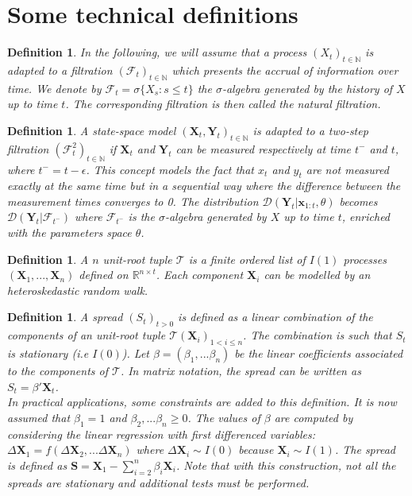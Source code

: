 \documentclass[11pt,a4,twosided,singlespacing,titlepagenumber=on]{scrreprt}
\numberwithin{equation}{chapter} %
\newtheorem{definition}[theorem]{Definition}%
\theoremstyle{remark}
\newcommand{\matr}[1]{\mathbf{#1}}
\begin{document}
\section{Some technical definitions}

\begin{definition}
In the following, we will assume that a process $(X_t)_{t \in \mathbb{N}}$ is adapted to a filtration $(\mathcal{F}_t)_{t \in \mathbb{N}}$ which presents the accrual of information over time. We denote by $\mathcal{F}_t = \sigma \{X_s : s \leq t \}$ the $\sigma$-algebra generated by the history of $X$ up to time $t$. The corresponding filtration is then called the natural filtration.
\end{definition}

\begin{definition}
A state-space model $(\matr{X}_t, \matr{Y}_t)_{t \in \mathbb{N}}$ is adapted to a two-step filtration $(\mathcal{F}^2_t)_{t \in \mathbb{N}}$ if $\matr{X}_t$ and $\matr{Y}_t$ can be measured respectively at time $t^-$ and $t$, where $t^- = t - \epsilon$. This concept models the fact that $x_t$ and $y_t$ are not measured exactly at the same time but in a sequential way where the difference between the measurement times converges to 0. The distribution $\mathcal{D}(\matr{Y}_t | \matr{x}_{1:t}, \theta)$ becomes $\mathcal{D}(\matr{Y}_t | \mathcal{F}_{t^-})$ where $\mathcal{F}_{t^-}$ is the $\sigma$-algebra generated by $X$ up to time $t$, enriched with the parameters space $\theta$.
\end{definition}

\begin{definition}
A $n$ unit-root tuple $\mathcal{T}$ is a finite ordered list of $I(1)$ processes $(\matr{X}_1, ..., \matr{X}_n)$ defined on $\mathbb{R}^{n \times t}$. Each component $\matr{X}_i$ can be modelled by an heteroskedastic random walk. \label{definition_tuple}
\end{definition}

\begin{definition}
\label{spread_def}
A spread $(S_t)_{t>0}$ is defined as a linear combination of the components of an unit-root tuple $\mathcal{T} (\matr{X}_i)_{1 < i \leq n}$. The combination is such that $S_t$ is stationary (i.e $I(0)$). Let $\beta = (\beta_1,...\beta_n)$ be the linear coefficients associated to the components of $\mathcal{T}$. In matrix notation, the spread can be written as $S_t = \beta' \matr{X}_t$. \\
In practical applications, some constraints are added to this definition. It is now assumed that $\beta_1 = 1$ and $\beta_2,...\beta_n \geq 0$. The values of $\beta$ are computed by considering the linear regression with first differenced variables: $\Delta \matr{X}_1 = f(\Delta \matr{X}_2,...\Delta \matr{X}_n)$ where $\Delta \matr{X}_i \sim I(0)$ because $\matr{X}_i \sim I(1)$. The spread is defined as $\matr{S} = \matr{X}_1 - \sum_{i=2}^n \beta_i \matr{X}_i$. Note that with this construction, not all the spreads are stationary and additional tests must be performed.
\end{definition}
\end{document}
